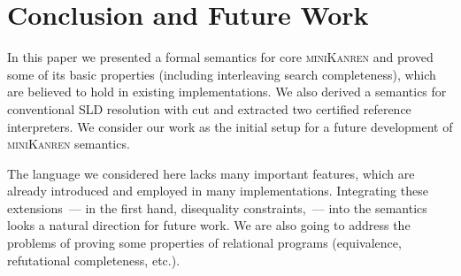 \section{Conclusion and Future Work}

In this paper we presented a formal semantics for core \textsc{miniKanren} and proved some of its basic properties
(including interleaving search completeness), which are believed to hold in existing implementations.
We also derived a semantics for conventional SLD resolution with cut and extracted two certified reference interpreters.
We consider our work as the initial setup for a future development of \textsc{miniKanren} semantics.

The language we considered here lacks many important features, which are already introduced
and employed in many implementations. Integrating these extensions~--- in the first hand, disequality constraints,~--- into
the semantics looks a natural direction for future work. We are also going to address the problems of proving some
properties of relational programs (equivalence, refutational completeness, etc.).
